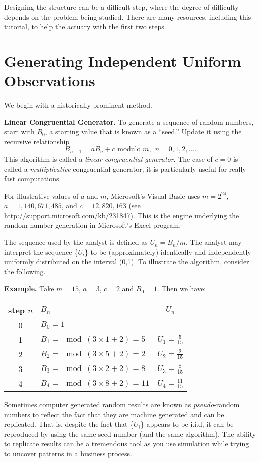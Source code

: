 \documentclass[]{book}
\theoremstyle{definition}
\theoremstyle{definition}
\theoremstyle{definition}
\theoremstyle{remark}
\begin{document}
Designing the structure can be a difficult step, where the degree of
difficulty depends on the problem being studied. There are many
resources, including this tutorial, to help the actuary with the first
two steps.

\section{Generating Independent Uniform
Observations}\label{generating-independent-uniform-observations}

We begin with a historically prominent method.

\textbf{Linear Congruential Generator.} To generate a sequence of random
numbers, start with \(B_0\), a starting value that is known as a
``seed.'' Update it using the recursive relationship
\[B_{n+1} = a B_n + c  \text{ modulo }m, ~~ n=0, 1, 2, \ldots .\] This
algorithm is called a \emph{linear congruential generator}. The case of
\(c=0\) is called a \emph{multiplicative} congruential generator; it is
particularly useful for really fast computations.

For illustrative values of \(a\) and \(m\), Microsoft's Visual Basic
uses \(m=2^{24}\), \(a=1,140,671,485\), and \(c = 12,820,163\) (see
\url{http://support.microsoft.com/kb/231847}). This is the engine
underlying the random number generation in Microsoft's Excel program.

The sequence used by the analyst is defined as \(U_n=B_n/m.\) The
analyst may interpret the sequence \{\(U_{i}\)\} to be (approximately)
identically and independently uniformly distributed on the interval
(0,1). To illustrate the algorithm, consider the following.

\textbf{Example.} Take \(m=15\), \(a=3\), \(c=2\) and \(B_0=1\). Then we
have:

\begin{longtable}[]{@{}clc@{}}
\toprule
step \(n\) & \(B_n\) & \(U_n\)\tabularnewline
\midrule
\endhead
0 & \(B_0=1\) &\tabularnewline
1 & \(B_1 =\mod(3 \times 1 +2) = 5\) &
\(U_1 = \frac{5}{15}\)\tabularnewline
2 & \(B_2 =\mod(3 \times 5 +2) = 2\) &
\(U_2 = \frac{2}{15}\)\tabularnewline
3 & \(B_3 =\mod(3 \times 2 +2) = 8\) &
\(U_3 = \frac{8}{15}\)\tabularnewline
4 & \(B_4 =\mod(3 \times 8 +2) = 11\) &
\(U_4 = \frac{11}{15}\)\tabularnewline
\bottomrule
\end{longtable}

Sometimes computer generated random results are known as
\emph{pseudo}-random numbers to reflect the fact that they are machine
generated and can be replicated. That is, despite the fact that
\{\(U_{i}\)\} appears to be i.i.d, it can be reproduced by using the
same seed number (and the same algorithm). The ability to replicate
results can be a tremendous tool as you use simulation while trying to
uncover patterns in a business process.
\end{document}
